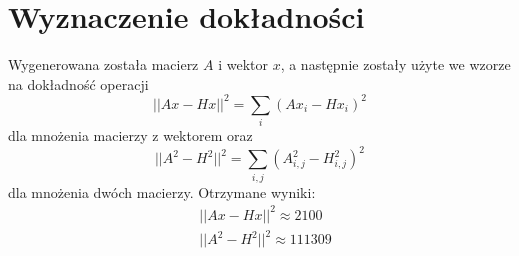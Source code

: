 \documentclass[11pt, leqno]{scrartcl}
\begin{document}
    \section{Wyznaczenie dokładności}
    Wygenerowana została macierz $A$ i wektor $x$, a następnie
    zostały użyte we wzorze na dokładność operacji
    \[
        ||Ax-Hx||^2=\sum_{i}(Ax_i-Hx_i)^2
    \]
    dla mnożenia macierzy z wektorem oraz
    \[
        ||A^2-H^2||^2=\sum_{i,j}(A_{i,j}^2-H_{i,j}^2)^2
    \]
    dla mnożenia dwóch macierzy. Otrzymane wyniki:
    \begin{align*}
        &||Ax-Hx||^2 \approx 2100 \\
        &||A^2-H^2||^2 \approx 111309
    \end{align*}
\end{document}
